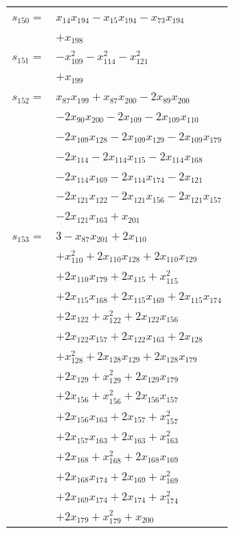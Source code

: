 \begin{longtable}{@{}r@{\;}l@{}}
\(s_{150}=\) & \(\displaystyle x_{14}x_{194} -x_{15}x_{194} -x_{73}x_{194}\) \\
 & \(\displaystyle +x_{198}\) \\[3pt]
\(s_{151}=\) & \(\displaystyle -x_{109}^{2} -x_{114}^{2} -x_{121}^{2}\) \\
 & \(\displaystyle +x_{199}\) \\[3pt]
\(s_{152}=\) & \(\displaystyle x_{87}x_{199} +x_{87}x_{200} -2x_{89}x_{200}\) \\
 & \(\displaystyle -2x_{90}x_{200} -2x_{109} -2x_{109}x_{110}\) \\
 & \(\displaystyle -2x_{109}x_{128} -2x_{109}x_{129} -2x_{109}x_{179}\) \\
 & \(\displaystyle -2x_{114} -2x_{114}x_{115} -2x_{114}x_{168}\) \\
 & \(\displaystyle -2x_{114}x_{169} -2x_{114}x_{174} -2x_{121}\) \\
 & \(\displaystyle -2x_{121}x_{122} -2x_{121}x_{156} -2x_{121}x_{157}\) \\
 & \(\displaystyle -2x_{121}x_{163} +x_{201}\) \\[3pt]
\(s_{153}=\) & \(\displaystyle 3 -x_{87}x_{201} +2x_{110}\) \\
 & \(\displaystyle +x_{110}^{2} +2x_{110}x_{128} +2x_{110}x_{129}\) \\
 & \(\displaystyle +2x_{110}x_{179} +2x_{115} +x_{115}^{2}\) \\
 & \(\displaystyle +2x_{115}x_{168} +2x_{115}x_{169} +2x_{115}x_{174}\) \\
 & \(\displaystyle +2x_{122} +x_{122}^{2} +2x_{122}x_{156}\) \\
 & \(\displaystyle +2x_{122}x_{157} +2x_{122}x_{163} +2x_{128}\) \\
 & \(\displaystyle +x_{128}^{2} +2x_{128}x_{129} +2x_{128}x_{179}\) \\
 & \(\displaystyle +2x_{129} +x_{129}^{2} +2x_{129}x_{179}\) \\
 & \(\displaystyle +2x_{156} +x_{156}^{2} +2x_{156}x_{157}\) \\
 & \(\displaystyle +2x_{156}x_{163} +2x_{157} +x_{157}^{2}\) \\
 & \(\displaystyle +2x_{157}x_{163} +2x_{163} +x_{163}^{2}\) \\
 & \(\displaystyle +2x_{168} +x_{168}^{2} +2x_{168}x_{169}\) \\
 & \(\displaystyle +2x_{168}x_{174} +2x_{169} +x_{169}^{2}\) \\
 & \(\displaystyle +2x_{169}x_{174} +2x_{174} +x_{174}^{2}\) \\
 & \(\displaystyle +2x_{179} +x_{179}^{2} +x_{200}\) \\[3pt]
\end{longtable}
\endgroup
